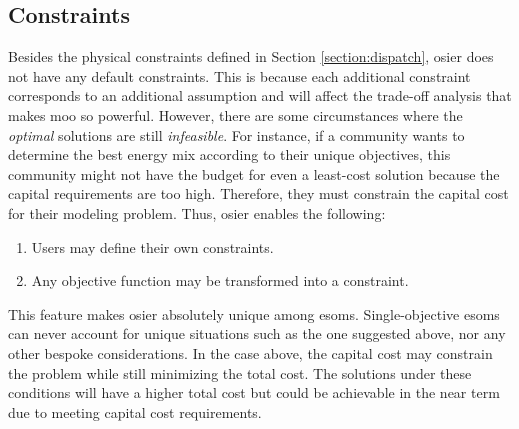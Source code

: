\subsection{Constraints}
Besides the physical constraints defined in Section \ref{section:dispatch}, 
\ac{osier} does not have any default constraints. This is because each additional
constraint corresponds to an additional assumption and will affect the trade-off
analysis that makes \ac{moo} so powerful. However, there are some circumstances
where the \textit{optimal} solutions are still \textit{infeasible}. For instance,
if a community wants to determine the best energy mix according to their unique
objectives, this community might not have the budget for even a least-cost solution because the capital requirements are too high. Therefore, they must
constrain the capital cost for their modeling problem. Thus, \ac{osier} enables
the following:
\begin{enumerate}
    \item Users may define their own constraints.
    \item Any objective function may be transformed into a constraint.
\end{enumerate}
This feature makes \ac{osier} absolutely unique among \acp{esom}. Single-objective \acp{esom} can never account for unique situations such as the one
suggested above, nor any other bespoke considerations. In the case above, the capital cost may constrain the problem while still minimizing the total cost. The solutions under these conditions will have a higher total cost but could be
achievable in the near term due to meeting capital cost requirements.
